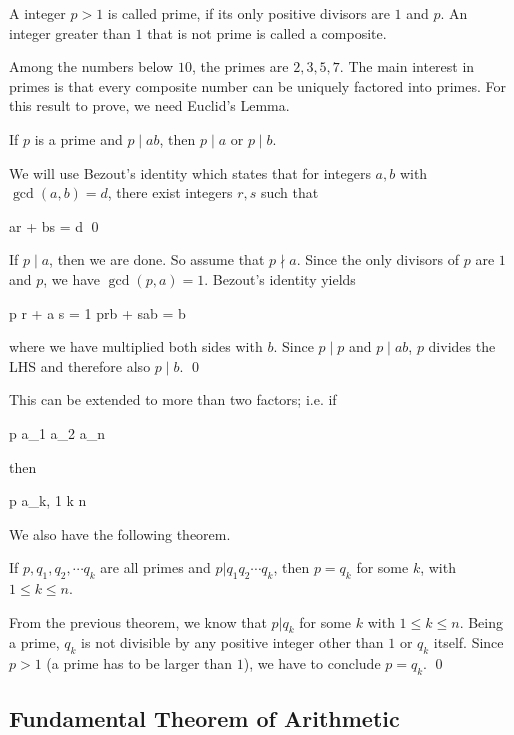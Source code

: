
\begin{definition}
    A integer $p>1$ is called prime, if its only positive divisors are $1$ and $p$. An integer greater than $1$ that is not prime is called a composite.
\end{definition}

Among the numbers below $10$, the primes are $2, 3, 5, 7$. The main interest in primes is that every composite number can be uniquely factored into primes.  For this result to prove, we need Euclid's Lemma.

\begin{theorem}
    If $p$ is a prime and $p \mid ab$, then $p \mid a$ or $p \mid b$.
\end{theorem}

We will use Bezout's identity which states that for integers $a, b$ with $\gcd(a,b) = d$, there exist integers $r,s$ such that

\bee
ar + bs = d \qed
\eee

If $p \mid a$, then we are done. So assume that $p \nmid a$. Since the only divisors of $p$ are $1$ and $p$, we have $\gcd(p,a) = 1$. Bezout's identity yields

\bee
p r + a s = 1 \rightarrow prb + sab = b
\eee

where we have multiplied both sides with $b$. Since $p \mid p$ and $p \mid ab$, $p$ divides the LHS and therefore also $p \mid b$. \qed

This can be extended to more than two factors; i.e. if

\bee
p \mid a_1 a_2 \cdots a_n
\eee

then

\bee
p \mid a_k,  1 \leq k \leq n
\eee

We also have the following theorem.

\begin{theorem}\label{th:primes_01_01}
    If $p, q_1, q_2, \cdots q_k$ are all primes and $p | q_1 q_2 \cdots q_k$, then $p = q_k$ for some $k$, with $1 \leq k \leq n$.
\end{theorem}

From the previous theorem, we know that $p | q_k$ for some $k$ with $1 \leq k \leq n$. Being a prime, $q_k$ is not divisible by any positive integer other than $1$ or $q_k$ itself. Since $p>1$ (a prime has to be larger than $1$), we have to conclude $p = q_k$. \qed

\subsection{Fundamental Theorem of Arithmetic}

